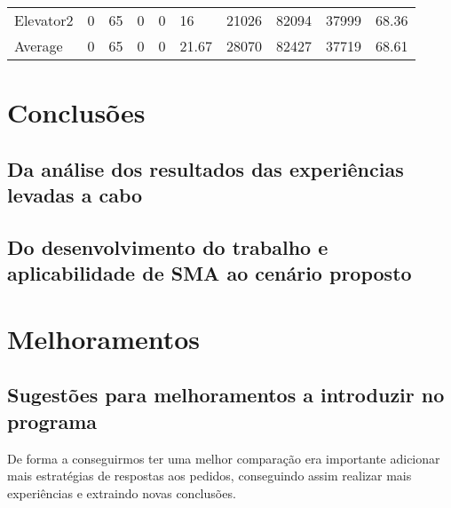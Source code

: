 \documentclass[a4paper]{article}
\begin{document}
\begin{table}[h]
\begin{tabular}{@{}llllllllll@{}}
Elevator2 & 0        & 65            & 0           & 0                                                               & 16                                                                  & 21026                                                         & 82094                                                 & 37999                                                   & 68.36         \\
Average   & 0     & 65         & 0        & 0                                                               & 21.67                                                               & 28070                                                         & 82427                                                 &  37719                                                  &  68.61        \\ \bottomrule
\end{tabular}
\end{table}

\newpage

\section{Conclusões}

\subsection{Da análise dos resultados das experiências levadas a cabo} 

\subsection{Do desenvolvimento do trabalho e aplicabilidade de SMA ao cenário proposto}

\newpage

\section{Melhoramentos}

\subsection{Sugestões para melhoramentos a introduzir no programa}

De forma a conseguirmos ter uma melhor comparação era importante adicionar mais estratégias de respostas aos pedidos, conseguindo assim realizar mais experiências e extraindo novas conclusões.
\end{document}
